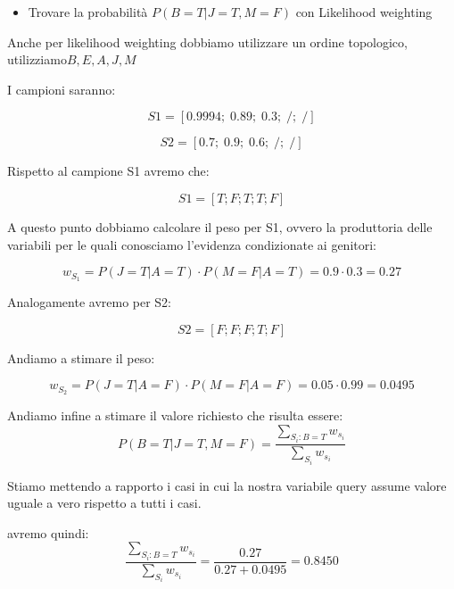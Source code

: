 \documentclass{article}
\begin{document}
\begin{itemize}
	\item Trovare la probabilità \(P(B = T| J = T, M = F)\) con Likelihood weighting
\end{itemize}

Anche per likelihood weighting dobbiamo utilizzare un ordine topologico, utilizziamo\(B, E , A ,J ,M \)

I campioni saranno:

\[
S1 = [0.9994; \; 0.89; \;  0.3; \;  /; \;  /]
\]

\[
S2 = [0.7; \; 0.9; \;  0.6; \;  /; \;  /]
\]

Rispetto al campione S1 avremo che:

\[
S1 = [T; F; T; T; F]
\]

A questo punto dobbiamo calcolare il peso per S1, ovvero la produttoria delle variabili per le quali conosciamo l'evidenza  condizionate ai genitori:

\[
 w_{S_1} = P(J = T | A = T) \cdot P(M = F | A = T) = 0.9 \cdot 0.3 = 0.27
\]

Analogamente avremo per S2:

\[
S2 = [F; F; F; T; F]
\]

Andiamo a stimare il peso:



\[
w_{S_2} = P(J = T | A = F) \cdot P(M = F | A = F) = 0.05 \cdot 0.99 = 0.0495
\]

\pagebreak
Andiamo infine a stimare il valore richiesto che risulta essere:
\[P(B = T | J = T, M = F) = \frac{\sum_{S_i : B = T} w_{s_i}}{{\sum_{S_i} w_{s_i}}} \]

Stiamo mettendo a rapporto i casi in cui la nostra variabile query assume valore uguale a vero rispetto a tutti i casi.

avremo quindi:
\[\frac{\sum_{S_i : B = T} w_{s_i}}{{\sum_{S_i} w_{s_i}}} = \frac{0.27}{0.27 + 0.0495} = 0.8450 \]

\pagebreak
\end{document}
